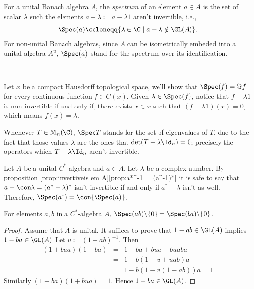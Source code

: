 \begin{definicao}[Spectrum]
For a unital Banach algebra $A$, the \textit{spectrum} of an element $a\in A$ is the set of scalar $\lambda$ such the elements $a-\lambda \coloneqq a - \lambda1$ aren't invertible, i.e.,
\begin{equation*}
    \Spec(a) \coloneqq \{\lambda \in \C \mid a-\lambda \notin \GL(A)\}.
\end{equation*}
For non-unital Banach algebras, since $A$ can be isometrically embeded into a unital algebra $A^u$, $\Spec(a)$ stand for the spectrum over its identification. 
\end{definicao}

\begin{exemplos}$\left.\right.$
\begin{itroman}
\item Let $x$ be a compact Hausdorff topological space, we'll show that $\Spec(f) = \Im f$ for every continuous function $f\in C(x)$. Given $\lambda\in \Spec(f)$, notice that $f - \lambda \textit{1}$ is non-invertible if and only if, there exists $x\in x$ such that  $(f- \lambda \textit{1})(x) = 0$, which means $f(x) = \lambda$.

\item Whenever $T\in \mathbb M_{n}(\C)$, $\Spec T$ stands for the set of eigenvalues of $T$, due to the fact that those values $\lambda$ are the ones that $\det(T-\lambda \Id_n)=0$; precisely the operators which $T-\lambda \Id_n$ aren't invertible.

\item Let $A$ be a unital $C^*$-algebra and $a\in A$. Let $\lambda$ be a complex number. By proposition \ref{prop:invertiveis em A}\ref{prop:a*^-1 = (a^-1)*} it is safe to say that $a-\con \lambda = (a^*-\lambda)^*$ isn't invertible if and only if $a^*-\lambda$ isn't as well. Therefore, $\Spec(a^*) = \con{\Spec(a)}$.
\end{itroman}
\end{exemplos}

\begin{lema}
\label{lema: Spec(ab)-0 = Spec(ba)-0}
For elements $a, b$ in a $C^*$-algebra $A$, $\Spec(a b) \backslash\{0\}=\Spec(b a) \backslash\{0\}$.
\end{lema}
\begin{proof}
Assume that $A$ is unital. It suffices to prove that $1-a b \in \GL(A)$ implies $1-b a \in \GL(A)$
Let $u\coloneqq (1-a b)^{-1}$. Then
\begin{equation*}
    \begin{array}{rcl}
(1+b u a)(1-b a) &=& 1-b a+b u a-b u a b a \\
&=& 1-b(1-u+u a b) a \\
&=& 1-b(1-u(1-a b)) a =1
\end{array}
\end{equation*}
Similarly $(1-b a)(1+b u a)=1$. Hence $1-b a \in \GL(A)$.
\end{proof}


